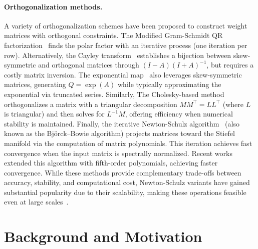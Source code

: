 \paragraph{Orthogonalization methods.} 
A variety of orthogonalization schemes have been proposed to construct weight matrices with orthogonal constraints.
The Modified Gram-Schmidt QR factorization~\cite{LaPlace1820} finds the polar factor with an iterative process (one iteration per row). 
Alternatively, the Cayley transform~\cite{Cayley_1846} establishes a bijection between skew-symmetric and orthogonal matrices through $(I-A)(I+A)^{-1}$, but requires a costly matrix inversion.
The exponential map~\cite{singla_skew_2021} also leverages skew-symmetric matrices, generating $Q=\exp(A)$ while typically approximating the exponential via truncated series. 
Similarly, The Cholesky-based method~\cite{hu_recipe_2023} orthogonalizes a matrix with a triangular decomposition $MM^\top=L L^\top$ (where $L$ is triangular) and then solves for $L^{-1}M$, offering efficiency when numerical stability is maintained. 
Finally, the iterative Newton-Schulz algorithm~\cite{bjorck1971iterative,anil_sorting_2019} (also known as the Bj\"orck--Bowie algorithm) projects matrices toward the Stiefel manifold via the computation of matrix polynomials.
This iteration achieves fast convergence when the input matrix is spectrally normalized.
Recent works~\cite{jordan2024muon, cesista2025muonoptcoeffs} extended this algorithm with fifth-order polynomials, achieving faster convergence.
While these methods provide complementary trade-offs between accuracy, stability, and computational cost, Newton-Schulz variants have gained substantial popularity due to their scalability, making these operations feasible even at large scales~\cite {kimi2025k2}.

\section{Background and Motivation}
\label{sec:bgnd_motiv}

